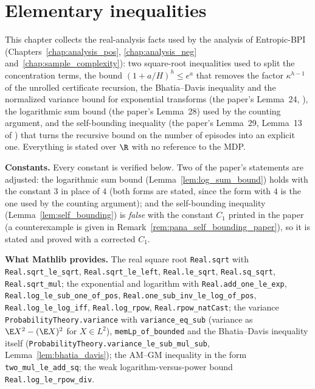 \chapter{Elementary inequalities}
\label{chap:pre_analysis}

This chapter collects the real-analysis facts used by the analysis of Entropic-BPI
(Chapters~\ref{chap:analysis_pos}, \ref{chap:analysis_neg} and~\ref{chap:sample_complexity}):
two square-root inequalities used to split the concentration terms, the bound
$(1 + a/H)^h \le e^a$ that removes the factor $\kappa^{h-1}$ of the unrolled certificate
recursion, the Bhatia--Davis inequality and the normalized variance bound for exponential
transforms (the paper's Lemma~24, \cite{essakine2026tight}), the logarithmic sum bound (the
paper's Lemma~28) used by the counting argument, and the self-bounding inequality (the paper's
Lemma~29, Lemma~13 of \cite{menard2021fast}) that turns the recursive bound on the number of
episodes into an explicit one. Everything is stated over $\R$ with no reference to the MDP.

\textbf{Constants.} Every constant is verified below. Two of the paper's statements are
adjusted: the logarithmic sum bound (Lemma~\ref{lem:log_sum_bound}) holds with the constant
$3$ in place of $4$ (both forms are stated, since the form with $4$ is the one used by the
counting argument); and the self-bounding inequality
(Lemma~\ref{lem:self_bounding}) is \emph{false} with the constant $C_1$ printed in the paper
(a counterexample is given in Remark~\ref{rem:pana_self_bounding_paper}), so it is stated and
proved with a corrected $C_1$.

\textbf{What Mathlib provides.} The real square root \texttt{Real.sqrt} with
\texttt{Real.sqrt\_le\_sqrt}, \texttt{Real.sqrt\_le\_left}, \texttt{Real.le\_sqrt},
\texttt{Real.sq\_sqrt}, \texttt{Real.sqrt\_mul}; the exponential and logarithm with
\texttt{Real.add\_one\_le\_exp}, \texttt{Real.log\_le\_sub\_one\_of\_pos},
\texttt{Real.one\_sub\_inv\_le\_log\_of\_pos}, \texttt{Real.log\_le\_log\_iff},
\texttt{Real.log\_rpow}, \texttt{Real.rpow\_natCast}; the variance
\texttt{ProbabilityTheory.variance} with \texttt{variance\_eq\_sub} (variance as
$\E X^2 - (\E X)^2$ for $X \in L^2$), \texttt{memLp\_of\_bounded} and the Bhatia--Davis
inequality itself (\texttt{ProbabilityTheory.variance\_le\_sub\_mul\_sub},
Lemma~\ref{lem:bhatia_davis}); the AM--GM inequality in the form \texttt{two\_mul\_le\_add\_sq};
the weak logarithm-versus-power bound \texttt{Real.log\_le\_rpow\_div}.

